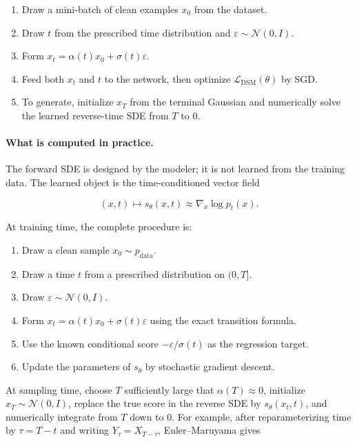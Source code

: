 \documentclass[11pt,a4paper]{article}
\theoremstyle{definition}
\begin{document}
\begin{enumerate}
    \item Draw a mini-batch of clean examples $x_0$ from the dataset.
    \item Draw $t$ from the prescribed time distribution and $\varepsilon\sim\mathcal{N}(0,I)$.
    \item Form $x_t=\alpha(t)x_0+\sigma(t)\varepsilon$.
    \item Feed both $x_t$ and $t$ to the network, then optimize $\mathcal{L}_{\mathrm{DSM}}(\theta)$ by SGD.
    \item To generate, initialize $x_T$ from the terminal Gaussian and numerically solve the learned reverse-time SDE from $T$ to $0$.
\end{enumerate}

\paragraph{What is computed in practice.}
The forward SDE is designed by the modeler; it is not learned from the training data.
The learned object is the time-conditioned vector field

\[
(x,t)\longmapsto s_\theta(x,t)\approx\nabla_x\log p_t(x).
\]

At training time, the complete procedure is:

\begin{enumerate}
    \item Draw a clean sample $x_0\sim p_{\mathrm{data}}$.
    \item Draw a time $t$ from a prescribed distribution on $(0,T]$.
    \item Draw $\varepsilon\sim\mathcal{N}(0,I)$.
    \item Form $x_t=\alpha(t)x_0+\sigma(t)\varepsilon$ using the exact transition formula.
    \item Use the known conditional score $-\varepsilon/\sigma(t)$ as the regression target.
    \item Update the parameters of $s_\theta$ by stochastic gradient descent.
\end{enumerate}

At sampling time, choose $T$ sufficiently large that $\alpha(T)\approx0$, initialize
$x_T\sim\mathcal{N}(0,I)$, replace the true score in the reverse SDE by
$s_\theta(x_t,t)$, and numerically integrate from $T$ down to $0$. For example, after
reparameterizing time by $\tau=T-t$ and writing $Y_\tau=X_{T-\tau}$, Euler--Maruyama
gives
\end{document}
